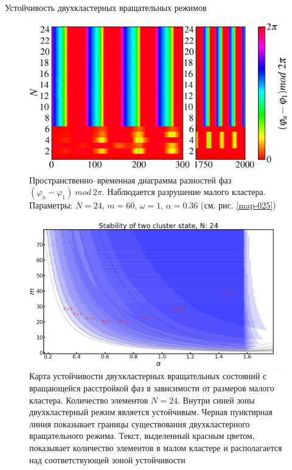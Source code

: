 \begin{chapter}{Устойчивость двухкластерных вращательных режимов}
	\begin{figure}[h!]
		\begin{center}
			\includegraphics[width=0.92\columnwidth]{pictures/Figure_yuy.png}
		\end{center}
		\caption{Пространственно--временная диаграмма разностей фаз $(\varphi_n - \varphi_1) \ mod \ 2\pi$.
		Наблюдается разрушение малого кластера.
		Параметры: $N=24$, $m = 60$, $\omega = 1$, $\alpha = 0.36$ (см. рис. \ref{map-025})}
		\label{st-c-4}
	\end{figure}

	\begin{figure}[h!]
		\begin{center}
			\includegraphics[width=1\columnwidth]{pictures/st-map.png}
		\end{center}
		\caption{Карта устойчивости двухкластерных вращательных состояний с вращающейся расстройкой фаз в зависимости от размеров малого кластера.
		Количество элементов $N = 24$. Внутри синей зоны двухкластерный режим является устойчивым. Черная пунктирная линия показывает
		границы существования двухкластерного вращательного режима. Текст, выделенный красным цветом, показывает количество элементов в малом
		кластере и располагается над соответствующей зоной устойчивости}
		\label{su-map}
	\end{figure}

\end{chapter}